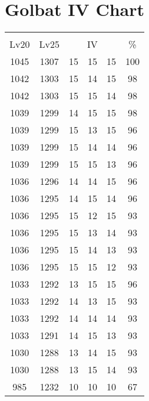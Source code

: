 \documentclass{article}%
\begin{document}
%
\normalsize%
\section{Golbat IV Chart}%
\label{sec:Golbat IV Chart}%
\renewcommand{\arraystretch}{1.5}%
\begin{tabular}{|c|c|c|c|c|c|}%
\hline%
\multicolumn{6}{|c|}{\textcolor{white}{ 
\linebreak{Golbat}
}%
\cellcolor{black}}\\%
\multicolumn{1}{|c}{Lv20}&\multicolumn{1}{c|}{Lv25}&\multicolumn{3}{c|}{IV}&\multicolumn{1}{|c|}{\%}\\%
\hline%
\rowcolor{color100}%
1045&1307&15&15&15&100\\%
\hline%
\rowcolor{color98}%
1042&1303&15&14&15&98\\%
\hline%
\rowcolor{color98}%
1042&1303&15&15&14&98\\%
\hline%
\rowcolor{color98}%
1039&1299&14&15&15&98\\%
\hline%
\rowcolor{color96}%
1039&1299&15&13&15&96\\%
\hline%
\rowcolor{color96}%
1039&1299&15&14&14&96\\%
\hline%
\rowcolor{color96}%
1039&1299&15&15&13&96\\%
\hline%
\rowcolor{color96}%
1036&1296&14&14&15&96\\%
\hline%
\rowcolor{color96}%
1036&1295&14&15&14&96\\%
\hline%
\rowcolor{color93}%
1036&1295&15&12&15&93\\%
\hline%
\rowcolor{color93}%
1036&1295&15&13&14&93\\%
\hline%
\rowcolor{color93}%
1036&1295&15&14&13&93\\%
\hline%
\rowcolor{color93}%
1036&1295&15&15&12&93\\%
\hline%
\rowcolor{color96}%
1033&1292&13&15&15&96\\%
\hline%
\rowcolor{color93}%
1033&1292&14&13&15&93\\%
\hline%
\rowcolor{color93}%
1033&1292&14&14&14&93\\%
\hline%
\rowcolor{color93}%
1033&1291&14&15&13&93\\%
\hline%
\rowcolor{color93}%
1030&1288&13&14&15&93\\%
\hline%
\rowcolor{color93}%
1030&1288&13&15&14&93\\%
\hline%
\rowcolor{color91}%
985&1232&10&10&10&67\\%
\end{tabular}

%
\end{document}
